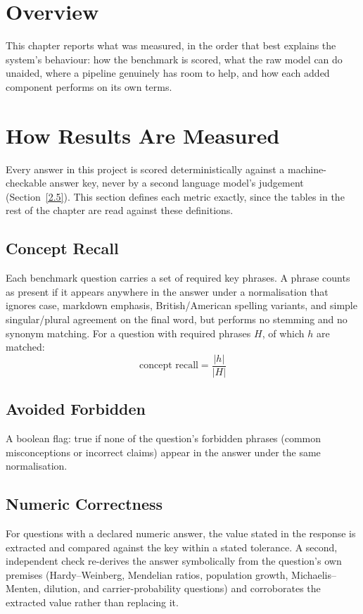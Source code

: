 \section{Overview}\label{4.1}

This chapter reports what was measured, in the order that best explains the
system's behaviour: how the benchmark is scored, what the raw model can do
unaided, where a pipeline genuinely has room to help, and how each added
component performs on its own terms.

\section{How Results Are Measured}\label{4.2}

Every answer in this project is scored deterministically against a
machine-checkable answer key, never by a second language model's
judgement (Section~\ref{2.5}). This section defines each metric exactly,
since the tables in the rest of the chapter are read against these
definitions.

\subsection*{Concept Recall}

Each benchmark question carries a set of required key phrases. A phrase
counts as present if it appears anywhere in the answer under a
normalisation that ignores case, markdown emphasis, British/American
spelling variants, and simple singular/plural agreement on the final word,
but performs no stemming and no synonym matching. For a question with
required phrases $H$, of which $h$ are matched:
\[
\text{concept recall} = \frac{|h|}{|H|}
\]

\subsection*{Avoided Forbidden}

A boolean flag: true if none of the question's forbidden phrases (common
misconceptions or incorrect claims) appear in the answer under the same
normalisation.

\subsection*{Numeric Correctness}

For questions with a declared numeric answer, the value stated in the
response is extracted and compared against the key within a stated
tolerance. A second, independent check re-derives the answer symbolically
from the question's own premises (Hardy--Weinberg, Mendelian ratios,
population growth, Michaelis--Menten, dilution, and carrier-probability
questions) and corroborates the extracted value rather than replacing it.

